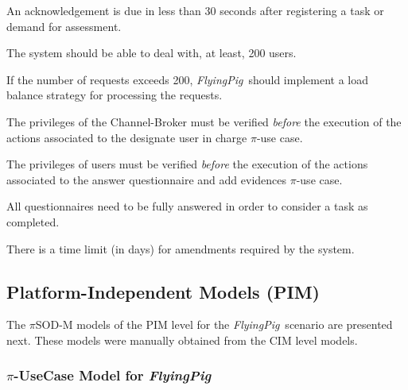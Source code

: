 \documentclass{singlecol-new}
\theoremstyle{TH}{
\newtheorem{lemma}{Lemma}
\newtheorem{theorem}[lemma]{Theorem}
\newtheorem{corrolary}[lemma]{Corrolary}
\newtheorem{conjecture}[lemma]{Conjecture}
\newtheorem{proposition}[lemma]{Proposition}
\newtheorem{claim}[lemma]{Claim}
\newtheorem{stheorem}[lemma]{Wrong Theorem}
\newtheorem{algorithm}{Algorithm}
}
\theoremstyle{THrm}{
\newtheorem{definition}{Definition}[section]
\newtheorem{question}{Question}[section]
\newtheorem{remark}{Remark}
\newtheorem{scheme}{Scheme}
}
\theoremstyle{THhit}{
\newtheorem{case}{Case}[section]
}
\theoremstyle{THhsl}{
\newtheorem{example}{Example}
}
\newcommand{\pisodm}[0]{$\pi$SOD-M\xspace}
\def\FlyingPig{\textsl{FlyingPig}\xspace}
\begin{document}
\begin{compactenum}
\item An acknowledgement is due in less than 30 seconds after registering a task or demand for assessment.
\item The system should be able to deal with, at least, 200 users.
\item If the number of requests exceeds 200, \FlyingPig\ should implement a load balance strategy for processing the requests.
\item The privileges of the Channel-Broker must be verified \textit{before} the execution of the actions associated to the \textsf{designate user in charge} $\pi$-use case.
\item The privileges of users must be verified \textit{before} the execution of the actions associated to the \textsf{answer questionnaire and add evidences} $\pi$-use case.
\item All questionnaires need to be fully answered in order to consider a task as completed.
\item There is a time limit (in days) for amendments required by the system.
\end{compactenum}

\subsection{Platform-Independent Models (PIM)}

The \pisodm models of the PIM level  for the \FlyingPig\ scenario are presented next.
These models were manually obtained from the CIM level models.




\subsubsection{$\pi$-UseCase Model for \FlyingPig}
\end{document}
